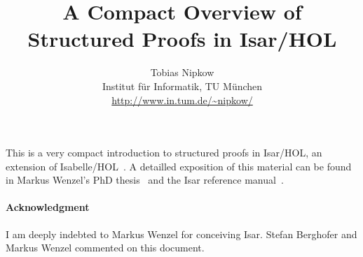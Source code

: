 \documentclass[11pt,a4paper]{article}
\begin{document}
\title{A Compact Overview of Structured Proofs in Isar/HOL}
\author{Tobias Nipkow\\Institut f{\"u}r Informatik, TU M{\"u}nchen\\
 \url{http://www.in.tum.de/~nipkow/}}
\date{}
\maketitle

\noindent
This is a very compact introduction to structured proofs in
Isar/HOL, an extension of Isabelle/HOL~\cite{LNCS2283}. A detailled
exposition of this material can be found in Markus Wenzel's PhD
thesis~\cite{Wenzel-PhD} and the Isar reference manual~\cite{Isar-Ref-Man}.



%


\paragraph{Acknowledgment}
I am deeply indebted to Markus Wenzel for conceiving Isar. Stefan Berghofer
and Markus Wenzel commented on this document.

\begingroup
 \small\raggedright\frenchspacing

\endgroup
\end{document}
